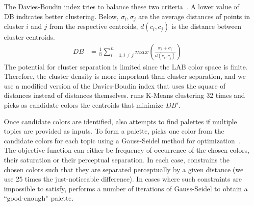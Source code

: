 The Davies-Boudin index tries to balance these two criteria~\cite{davies1979cluster}.  A lower value of DB indicates better clustering. Below, $\sigma_{i}, \sigma_{j}$ are the average distances of points in cluster $i$ and $j$ from the respective centroids, $d(c_{i}, c_{j})$ is the distance between cluster centroids.
\begin{align}
DB &= \frac{1}{n} \sum_{i=1, i \neq j}^{n}max\left(\frac{\sigma_{i} + \sigma_{j}}{d(c_{i}, c_{j})}\right)
\end{align}
The potential for cluster separation is limited since the LAB color space is finite. Therefore, the cluster density is more important than cluster separation, and we use a modified version of the Davies-Boudin index that uses the square of distances instead of distances themselves. \system runs K-Means clustering 32 times and picks as candidate colors the centroids that minimize $DB'$. 

Once candidate colors are identified, \system also attempts to find palettes if multiple topics are provided as inputs. To form a palette, \system picks one color from the candidate colors for each topic using a Gauss-Seidel method for optimization~\cite{dwyer2009scalable}. The objective function can either be frequency of occurrence of the chosen colors, their saturation or their perceptual separation. In each case, \system constrains the chosen colors such that they are separated perceptually by a given distance (we use 25 times the just-noticeable difference). In cases where such constraints are impossible to satisfy, \system performs a number of iterations of Gauss-Seidel to obtain a ``good-enough'' palette.